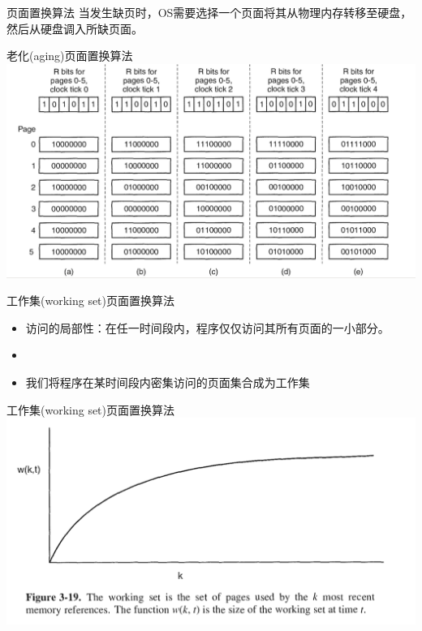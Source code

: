 \documentclass[xcolor=svgnames]{beamer}
\begin{document}
\begin{CJK*}{UTF8}{gbsn}
\begin{frame}{页面置换算法}
当发生缺页时，OS需要选择一个页面将其从物理内存转移至硬盘，然后从硬盘调入所缺页面。
\end{frame}

\begin{frame}{老化(aging)页面置换算法}
\includegraphics[width=1.0\textwidth]{aging.png}
\end{frame}

\begin{frame}{工作集(working set)页面置换算法}
\begin{itemize}
\item 访问的\alert{局部性}：在任一时间段内，程序仅仅访问其所有页面的一小部分。
\item[]
\item 我们将程序在某时间段内密集访问的页面集合成为\alert{工作集}
\end{itemize}
\end{frame}

\begin{frame}{工作集(working set)页面置换算法}
\includegraphics[width=1.0\textwidth]{ws0.png}
\end{frame}


\end{CJK*}
\end{document}
